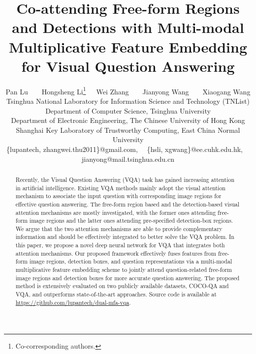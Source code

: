 \documentclass[letterpaper]{article}
\begin{document}
	
	
\title{Co-attending Free-form Regions and Detections with Multi-modal Multiplicative Feature Embedding for Visual Question Answering}



\author{Pan Lu~~~~Hongsheng Li\thanks{Co-corresponding authors.}~~~Wei Zhang~~~~Jianyong Wang~~~~Xiaogang Wang\footnotemark[1]\\
	 Tsinghua National Laboratory for Information Science and Technology (TNList)\\
	Department of Computer Science, Tsinghua University\\
	 Department of Electronic Engineering, The Chinese University of Hong Kong\\
	 Shanghai Key Laboratory of Trustworthy Computing, East China Normal University\\
	\{lupantech, zhangwei.thu2011\}@gmail.com,~~
	\{hsli, xgwang\}@ee.cuhk.edu.hk,~~
	jianyong@mail.tsinghua.edu.cn
}
\maketitle

\begin{abstract}


Recently, the Visual Question Answering (VQA) task has gained increasing attention in artificial intelligence. Existing VQA methods mainly adopt the visual attention mechanism to associate the input question with corresponding image regions for effective question answering. The free-form region based and the detection-based visual attention mechanisms are mostly investigated, with the former ones attending free-form image regions and the latter ones attending pre-specified detection-box regions. We argue that the two attention mechanisms are able to provide complementary information and should be effectively integrated to better solve the VQA problem. In this paper, we propose a novel deep neural network for VQA that integrates both attention mechanisms. Our proposed framework effectively fuses features from free-form image regions, detection boxes, and question representations via a multi-modal multiplicative feature embedding scheme to jointly attend question-related free-form image regions and detection boxes for more accurate question answering. The proposed method is extensively evaluated on two publicly available datasets, COCO-QA and VQA, and outperforms state-of-the-art approaches. Source code is available at \url{https://github.com/lupantech/dual-mfa-vqa}.



\end{abstract}
\end{document}
